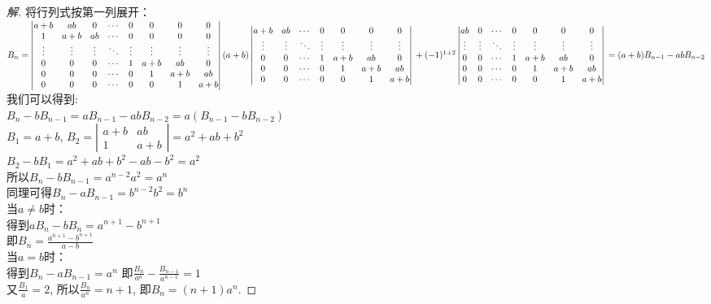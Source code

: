 \documentclass[10pt,a4paper]{report}
\begin{document}
\begin{proof}[解]
	将行列式按第一列展开：\\
	$B_{n} = 
	\left|
	\begin{matrix}
	a+b & ab & 0 & \cdots & 0 & 0 & 0 & 0\\
	1 & a+b & ab & \cdots & 0 & 0 & 0 & 0\\
	\vdots & \vdots & \vdots & \ddots & \vdots & \vdots & \vdots & \vdots \\
	0 & 0 & 0 & \cdots & 1 & a+b & ab & 0 \\
	0 & 0 & 0 & \cdots & 0 & 1 & a+b & ab\\
	0 & 0 & 0 & \cdots & 0 & 0 & 1 & a+b
	\end{matrix}
	\right|\\
	(a+b)
	\left|
	\begin{matrix}
	a+b & ab & \cdots & 0 & 0 & 0 & 0\\
	\vdots & \vdots & \ddots & \vdots & \vdots & \vdots & \vdots \\
	0 & 0 & \cdots & 1 & a+b & ab & 0 \\
	0 & 0 & \cdots & 0 & 1 & a+b & ab\\
	0 & 0 & \cdots & 0 & 0 & 1 & a+b
	\end{matrix}
	\right|\\
	+(-1)^{1+2}
	\left|
	\begin{matrix}
	ab & 0 & \cdots & 0 & 0 & 0 & 0\\
	\vdots & \vdots & \ddots & \vdots & \vdots & \vdots & \vdots \\
	0 & 0 & \cdots & 1 & a+b & ab & 0 \\
	0 & 0 & \cdots & 0 & 1 & a+b & ab\\
	0 & 0 & \cdots & 0 & 0 & 1 & a+b
	\end{matrix}
	\right|\\
	=(a+b)B_{n-1}-abB_{n-2}$\\
	我们可以得到:\\
	$B_{n}-bB_{n-1} = aB_{n-1}-abB_{n-2} = a(B_{n-1}-bB_{n-2})$\\
	$B_{1} = a+b$,
	$B_{2} = \left|
	\begin{matrix}
	a+b & ab\\
	1 & a+b 
	\end{matrix}
	\right| = a^{2}+ab+b^{2}$\\
	$B_{2}-bB_{1} = a^{2}+ab+b^{2}-ab-b^{2}=a^{2}$\\
	所以$B_{n}-bB_{n-1} = a^{n-2}a^{2} = a^{n}$\\
	同理可得$B_{n}-aB_{n-1} = b^{n-2}b^{2} = b^{n}$\\
	当$a \neq b$时：\\
	得到$aB_{n}-bB_{n} = a^{n+1}-b^{n+1}$\\
	即$B_{n} = \frac{a^{n+1}-b^{n+1}}{a-b}$\\
	当$a = b$时：\\
	得到$B_{n}-aB_{n-1} = a^{n}$
	即$\frac{B_{n}}{a^{n}} - \frac{B_{n-1}}{a^{n-1}} = 1$\\
	又$\frac{B_{1}}{a} = 2$, 所以$\frac{B_{n}}{a^{n}} = n+1$, 即$B_{n} = (n+1)a^{n}$.
\end{proof}
\end{document}
